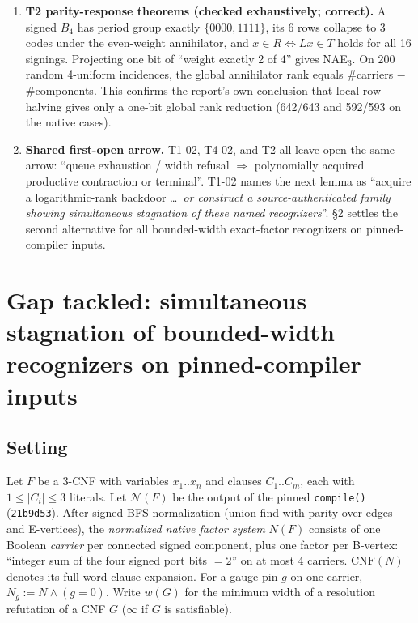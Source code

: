 \documentclass[11pt]{article}
\theoremstyle{definition}
\begin{document}
\begin{enumerate}
\item \textbf{T2 parity-response theorems (checked exhaustively; correct).} A signed $B_4$ has period group exactly $\{0000,1111\}$, its 6 rows collapse to 3 codes under the even-weight annihilator, and $x\in R\iff Lx\in T$ holds for all 16 signings. Projecting one bit of ``weight exactly 2 of 4'' gives NAE$_3$. On 200 random 4-uniform incidences, the global annihilator rank equals $\#$carriers $-$ $\#$components. This confirms the report's own conclusion that local row-halving gives only a one-bit global rank reduction (642/643 and 592/593 on the native cases).
\item \textbf{Shared first-open arrow.} T1-02, T4-02, and T2 all leave open the same arrow: ``queue exhaustion / width refusal $\Rightarrow$ polynomially acquired productive contraction or terminal''. T1-02 names the next lemma as ``acquire a logarithmic-rank backdoor \ldots\ \emph{or construct a source-authenticated family showing simultaneous stagnation of these named recognizers}''. \S2 settles the second alternative for all bounded-width exact-factor recognizers on pinned-compiler inputs.
\end{enumerate}

\section{Gap tackled: simultaneous stagnation of bounded-width recognizers on pinned-compiler inputs}
\subsection*{Setting}
Let $F$ be a 3-CNF with variables $x_1..x_n$ and clauses $C_1..C_m$, each with $1\le|C_i|\le3$ literals. Let $\mathcal N(F)$ be the output of the pinned \texttt{compile()} (\texttt{21b9d53}). After signed-BFS normalization (union-find with parity over edges and E-vertices), the \emph{normalized native factor system} $N(F)$ consists of one Boolean \emph{carrier} per connected signed component, plus one factor per B-vertex: ``integer sum of the four signed port bits $=2$'' on at most 4 carriers. $\mathrm{CNF}(N)$ denotes its full-word clause expansion. For a gauge pin $g$ on one carrier, $N_g:=N\wedge(g{=}0)$. Write $w(G)$ for the minimum width of a resolution refutation of a CNF $G$ ($\infty$ if $G$ is satisfiable).
\end{document}
